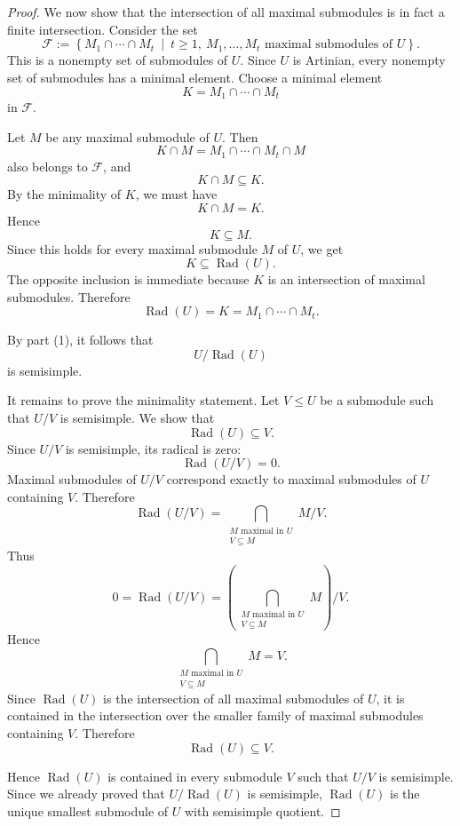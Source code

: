 \begin{proof}
    We now show that the intersection of all maximal submodules is in fact a finite
    intersection. Consider the set
    \[
        \mathcal{F}
        :=
        \left\{
            M_1\cap\cdots\cap M_t
            \ \middle|\
            t\geq 1,\ M_1,\dots,M_t\text{ maximal submodules of }U
        \right\}.
    \]
    This is a nonempty set of submodules of $U$. Since $U$ is Artinian, every nonempty
    set of submodules has a minimal element. Choose a minimal element
    \[
        K=M_1\cap\cdots\cap M_t
        \]
    in $\mathcal{F}$.

    Let $M$ be any maximal submodule of $U$. Then
    \[
        K\cap M=M_1\cap\cdots\cap M_t\cap M
    \]
    also belongs to $\mathcal{F}$, and
    \[
        K\cap M\subseteq K.
    \]
    By the minimality of $K$, we must have
    \[
        K\cap M=K.
    \]
    Hence
    \[
        K\subseteq M.
    \]
    Since this holds for every maximal submodule $M$ of $U$, we get
    \[
        K\subseteq \operatorname{Rad}(U).
    \]
    The opposite inclusion is immediate because $K$ is an intersection of maximal
    submodules. Therefore
    \[
        \operatorname{Rad}(U)=K=M_1\cap\cdots\cap M_t.
    \]

    By part (1), it follows that
    \[
        U/\operatorname{Rad}(U)
    \]
    is semisimple.

    It remains to prove the minimality statement. Let $V\leq U$ be a submodule such
    that $U/V$ is semisimple. We show that
    \[
        \operatorname{Rad}(U)\subseteq V.
    \]
    Since $U/V$ is semisimple, its radical is zero:
    \[
        \operatorname{Rad}(U/V)=0.
    \]
    Maximal submodules of $U/V$ correspond exactly to maximal submodules of $U$
    containing $V$. Therefore
    \[
        \operatorname{Rad}(U/V)
        =
        \bigcap_{\substack{M\text{ maximal in }U\\ V\subseteq M}}
        M/V.
    \]
    Thus
    \[
        0
        =
        \operatorname{Rad}(U/V)
        =
        \left(
        \bigcap_{\substack{M\text{ maximal in }U\\ V\subseteq M}}
        M
        \right)/V.
    \]
    Hence
    \[
        \bigcap_{\substack{M\text{ maximal in }U\\ V\subseteq M}}M
        =
        V.
    \]
    Since $\operatorname{Rad}(U)$ is the intersection of all maximal submodules of $U$,
    it is contained in the intersection over the smaller family of maximal submodules
    containing $V$. Therefore
    \[
        \operatorname{Rad}(U)\subseteq V.
    \]

    Hence $\operatorname{Rad}(U)$ is contained in every submodule $V$ such that
    $U/V$ is semisimple. Since we already proved that $U/\operatorname{Rad}(U)$ is
    semisimple, $\operatorname{Rad}(U)$ is the unique smallest submodule of $U$ with
    semisimple quotient.
\end{proof}

